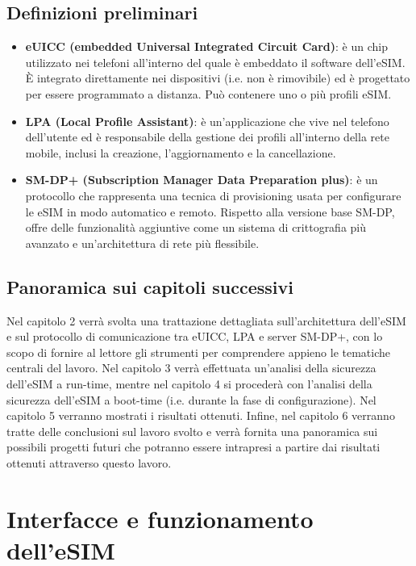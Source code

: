 \documentclass[10pt, twoside, openany]{book}
\begin{document}
\section{Definizioni preliminari}
\begin{itemize}
\item \textbf{eUICC (embedded Universal Integrated Circuit Card)}: è un chip utilizzato nei telefoni all'interno del quale è embeddato il software dell'eSIM. È integrato direttamente nei dispositivi (i.e. non è rimovibile) ed è progettato per essere programmato a distanza. Può contenere uno o più profili eSIM.
\item \textbf{LPA (Local Profile Assistant)}: è un'applicazione che vive nel telefono dell'utente ed è responsabile della gestione dei profili all'interno della rete mobile, inclusi la creazione, l'aggiornamento e la cancellazione.
\item \textbf{SM-DP+ (Subscription Manager Data Preparation plus)}: è un protocollo che rappresenta una tecnica di provisioning usata per configurare le eSIM in modo automatico e remoto. Rispetto alla versione base SM-DP, offre delle funzionalità aggiuntive come un sistema di crittografia più avanzato e un'architettura di rete più flessibile.
\end{itemize}

\section{Panoramica sui capitoli successivi}
Nel capitolo 2 verrà svolta una trattazione dettagliata sull'architettura dell'eSIM e sul protocollo di comunicazione tra eUICC, LPA e server SM-DP+, con lo scopo di fornire al lettore gli strumenti per comprendere appieno le tematiche centrali del lavoro. Nel capitolo 3 verrà effettuata un'analisi della sicurezza dell'eSIM a run-time, mentre nel capitolo 4 si procederà con l'analisi della sicurezza dell'eSIM a boot-time (i.e. durante la fase di configurazione). Nel capitolo 5 verranno mostrati i risultati ottenuti. Infine, nel capitolo 6 verranno tratte delle conclusioni sul lavoro svolto e verrà fornita una panoramica sui possibili progetti futuri che potranno essere intrapresi a partire dai risultati ottenuti attraverso questo lavoro.

\chapter{Interfacce e funzionamento dell'eSIM}
\end{document}
